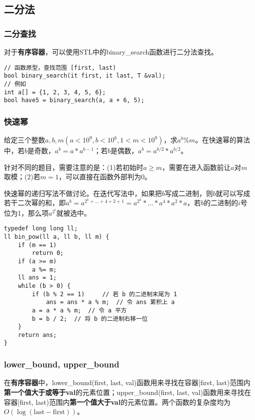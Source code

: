 \subsection{二分法}

\subsubsection{二分查找}

对于\textbf{有序容器}，可以使用STL中的binary\_search函数进行二分法查找。

\begin{lstlisting}
// 函数原型，查找范围 [first, last)
bool binary_search(it first, it last, T &val);
// 例如
int a[] = {1, 2, 3, 4, 5, 6};
bool have5 = binary_search(a, a + 6, 5);
\end{lstlisting}

\subsubsection{快速幂}

给定三个整数$a, b, m(a<10^9, b<10^6, 1<m<10^9)$，求$a^b\%m$。在快速幂的算法中，若$b$是奇数，$a^b=a*a^{b-1}$；若$b$是偶数，$\displaystyle{ a^b=a^{b/2}*a^{b/2}}$。

针对不同的题目，需要注意的是：(1)若初始时$a\geq m$，需要在进入函数前让$a$对$m$取模；(2)若$m=1$，可以直接在函数外部判为0。

快速幂的递归写法不做讨论。在迭代写法中，如果把$b$写成二进制，则$b$就可以写成若干二次幂的和，即$a^b=a^{2^k+...+4+2+1}=a^{2^k}*...*a^4*a^2*a$，若$b$的二进制的$i$号位为1，那么项$a^{2^i}$就被选中。

\begin{lstlisting}
typedef long long ll;
ll bin_pow(ll a, ll b, ll m) {
	if (m == 1)
		return 0;
	if (a >= m)
		a %= m;
	ll ans = 1;
	while (b > 0) {
		if (b % 2 == 1)		// 若 b 的二进制末尾为 1
			ans = ans * a % m;	// 令 ans 累积上 a
		a = a * a % m;	// 令 a 平方
		b = b / 2;	// 将 b 的二进制右移一位
	}
	return ans;
}
\end{lstlisting}

\subsubsection{lower\_bound, upper\_bound}

在\textbf{有序容器}中，lower\_bound(first, last, val)函数用来寻找在容器[first, last)范围内\textbf{第一个值大于或等于val}的元素位置；upper\_bound(first, last, val)函数用来寻找在容器[first, last)范围内\textbf{第一个值大于val}的元素位置。两个函数的复杂度均为$O(\log(\textrm{last}-\textrm{first}))$。
